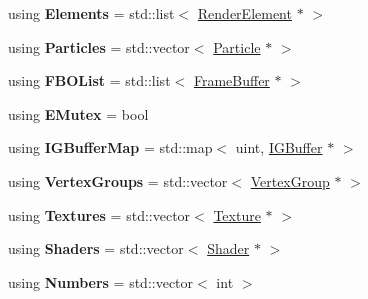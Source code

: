 \begin{DoxyCompactItemize}
\item 
\hypertarget{namespaceEngine_aabe94f14f2699f32a88cb6df7e97c8c0}{}using {\bfseries Elements} = std\+::list$<$ \hyperlink{classEngine_1_1RenderElement}{Render\+Element} $\ast$ $>$\label{namespaceEngine_aabe94f14f2699f32a88cb6df7e97c8c0}

\item 
\hypertarget{namespaceEngine_a42c6f304ec87f4790ba7c53e35e4779a}{}using {\bfseries Particles} = std\+::vector$<$ \hyperlink{structEngine_1_1Particle}{Particle} $\ast$ $>$\label{namespaceEngine_a42c6f304ec87f4790ba7c53e35e4779a}

\item 
\hypertarget{namespaceEngine_ad5677c0e3f752555a3d10e61e6655ed4}{}using {\bfseries F\+B\+O\+List} = std\+::list$<$ \hyperlink{classEngine_1_1FrameBuffer}{Frame\+Buffer} $\ast$ $>$\label{namespaceEngine_ad5677c0e3f752555a3d10e61e6655ed4}

\item 
\hypertarget{namespaceEngine_a2591c48b70450c86b9a55616fd95ab66}{}using {\bfseries E\+Mutex} = bool\label{namespaceEngine_a2591c48b70450c86b9a55616fd95ab66}

\item 
\hypertarget{namespaceEngine_a9b378ecc5f3ab0bb0d5394182991aac1}{}using {\bfseries I\+G\+Buffer\+Map} = std\+::map$<$ uint, \hyperlink{classEngine_1_1IGBuffer}{I\+G\+Buffer} $\ast$ $>$\label{namespaceEngine_a9b378ecc5f3ab0bb0d5394182991aac1}

\item 
\hypertarget{namespaceEngine_a030b22b235ac490afb108182332008b0}{}using {\bfseries Vertex\+Groups} = std\+::vector$<$ \hyperlink{classEngine_1_1VertexGroup}{Vertex\+Group} $\ast$ $>$\label{namespaceEngine_a030b22b235ac490afb108182332008b0}

\item 
\hypertarget{namespaceEngine_abbf11264b82bd537ae38510aaf0bbef4}{}using {\bfseries Textures} = std\+::vector$<$ \hyperlink{classEngine_1_1Texture}{Texture} $\ast$ $>$\label{namespaceEngine_abbf11264b82bd537ae38510aaf0bbef4}

\item 
\hypertarget{namespaceEngine_ac4afc4ab46fc89b6cdfac9aea4e4c338}{}using {\bfseries Shaders} = std\+::vector$<$ \hyperlink{classEngine_1_1Shader}{Shader} $\ast$ $>$\label{namespaceEngine_ac4afc4ab46fc89b6cdfac9aea4e4c338}

\item 
\hypertarget{namespaceEngine_a91b34d51cb1ed6c2f16b2318cfae0772}{}using {\bfseries Numbers} = std\+::vector$<$ int $>$\label{namespaceEngine_a91b34d51cb1ed6c2f16b2318cfae0772}


\end{DoxyCompactItemize}
